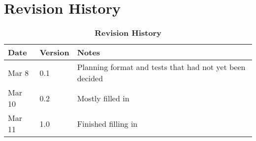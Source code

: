 \documentclass[12pt, titlepage]{article}
\begin{document}
\newpage

\section{Revision History}

\begin{table}[hp]
\caption{\bf Revision History}
\begin{tabularx}{\textwidth}{p{3cm}p{2cm}X}
\toprule {\bf Date} & {\bf Version} & {\bf Notes}\\
\midrule
Mar 8 & 0.1 & Planning format and tests that had not yet been decided\\
Mar 10 & 0.2 & Mostly filled in\\
Mar 11 & 1.0 & Finished filling in\\
\bottomrule
\end{tabularx}
\end{table}
\end{document}
